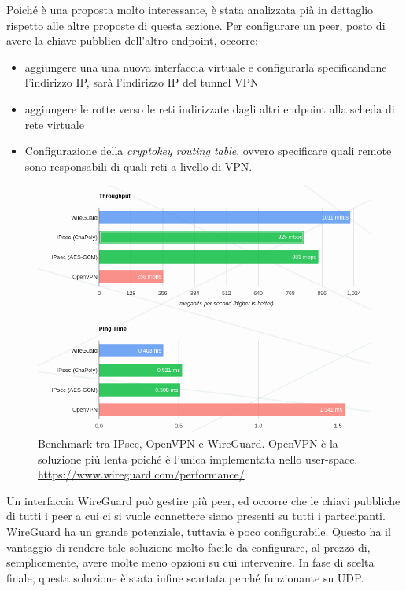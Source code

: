 	      
	      Poiché è una proposta molto interessante, è stata analizzata pià in dettaglio rispetto
	      alle altre proposte di questa sezione. Per configurare un peer,
	      posto di avere la chiave pubblica dell'altro endpoint, occorre:
	      \begin{itemize}
	      	\item aggiungere una una nuova interfaccia virtuale e configurarla specificandone
	      	      l'indirizzo IP, sarà l'indirizzo IP del tunnel VPN
	      	\item aggiungere le rotte verso le reti indirizzate dagli altri endpoint alla scheda
	      	      di rete virtuale
	      	\item Configurazione della \textit{cryptokey routing table}, ovvero specificare
	      	      quali remote sono responsabili di quali reti a livello di VPN\cite{wireguard-quick-start}.
	      \end{itemize}
	      \begin{figure}
	      	\includegraphics[scale=0.45]{img/wireguard_performance}
			  \caption[Benchmark tra IPsec, OpenVPN e WireGuard]{Benchmark tra IPsec, OpenVPN e WireGuard.
			  	OpenVPN è la soluzione più lenta poiché è l'unica implementata nello user-space.
	      		\url{https://www.wireguard.com/performance/}}
	      	\label{fig:wireguard-performance}
		  \end{figure}
		  Un interfaccia WireGuard può gestire più peer, ed occorre che le chiavi pubbliche di tutti
	      i peer a cui ci si vuole connettere siano presenti su tutti i partecipanti.
		  WireGuard ha un grande potenziale, tuttavia è poco configurabile. Questo ha il vantaggio
		  di rendere tale soluzione molto facile da configurare, al prezzo di, semplicemente, avere
		  molte meno opzioni su cui intervenire. In fase di scelta
	      finale, questa soluzione è stata infine scartata perché funzionante su UDP.
	      
